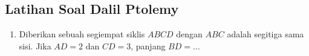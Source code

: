 \subsection{Latihan Soal Dalil Ptolemy}
\begin{enumerate}
    \item Diberikan sebuah segiempat siklis $ABCD$ dengan $ABC$ adalah segitiga sama sisi. Jika $AD=2$ dan $CD=3$, panjang $BD=\dots$
\end{enumerate}